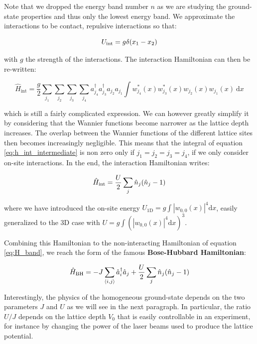 \noindent Note that we dropped the energy band number $n$ as we are studying the ground-state properties and thus only the lowest energy band. We approximate the interactions to be contact, repulsive interactions so that:

\begin{equation}
    U_{\rm{int}}= g \delta (x_1 - x_2)
\end{equation}

\noindent with $g$ the strength of the interactions. The interaction Hamiltonian can then be re-written:

\begin{equation}
    \hat{H}_{\mathrm{int}}=\frac{g}{2} \sum_{j_{1}} \sum_{j_{2}} \sum_{j_{3}} \sum_{j_{4}} a_{j_{4}}^{\dagger} a_{j_{3}}^{\dagger} a_{j_{2}} a_{j_{1}} \int w_{j_{4}}^{*}(x) w_{j_{3}}^{*}(x) w_{j_{2}}(x) w_{j_{1}}(x) \mathrm{~d} x
    \label{eq:h_int_intermediate}
\end{equation}

\noindent which is still a fairly complicated expression. We can however greatly simplify it by considering that the Wannier functions become narrower as the lattice depth increases. The overlap between the Wannier functions of the different lattice sites then becomes increasingly negligible. This means that the integral of equation \ref{eq:h_int_intermediate} is non zero only if $j_1=j_2=j_3=j_4$, \ie if we only consider on-site interactions. In the end, the interaction Hamiltonian writes:

\begin{equation}
    \hat{H}_{\rm{int}}=\frac{U}{2} \sum_j \hat{n}_j (\hat{n}_j -1)
\end{equation}

\noindent where we have introduced the on-site energy $U_{\mathrm{1D}}=g \int\left|w_{0,0}(x)\right|^{4} \mathrm{d}x$, easily generalized to the 3D case with $U=g \int(\left|w_{0,0}(x)\right|^{4} \mathrm{d}x)^3$. 

Combining this Hamiltonian to the non-interacting Hamiltonian of equation \ref{eq:H_band}, we reach the form of the famous \textbf{Bose-Hubbard Hamiltonian}:

\begin{equation}
    \hat{H}_{\mathrm{BH}}= -J \sum_{\left\langle i,j\right\rangle} \hat{a}^{\dagger}_i \hat{a}_j + \frac{U}{2} \sum_j \hat{n}_j (\hat{n}_j -1)
\end{equation}

\noindent Interestingly, the physics of the homogeneous ground-state depends on the two parameters $J$ and $U$ as we will see in the next paragraph. In particular, the ratio $U/J$ depends on the lattice depth $V_0$ that is easily controllable in an experiment, for instance by changing the power of the laser beams used to produce the lattice potential.


